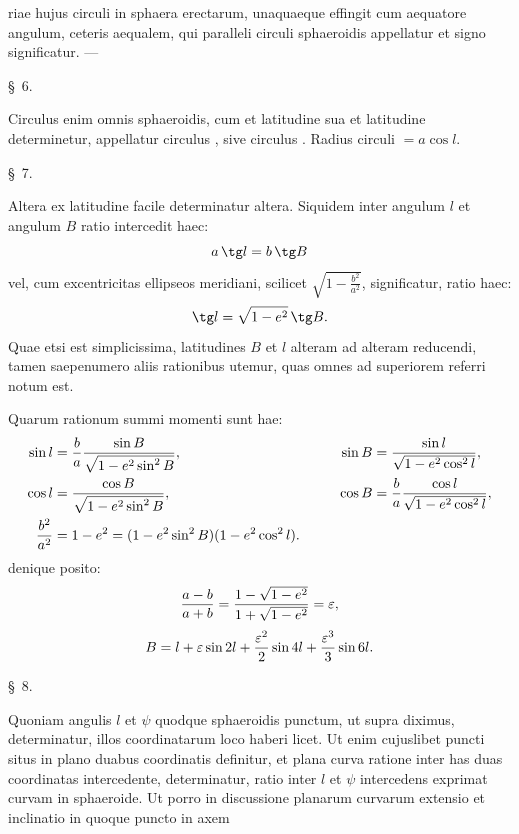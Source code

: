riae hujus circuli in sphaera erectarum, unaquaeque effingit cum aequatore angulum, ceteris aequalem, qui  paralleli circuli sphaeroidis appellatur et signo  significatur. ---

\begin{center}\S\ 6.\end{center}
Circulus enim omnis sphaeroidis, cum et latitudine sua  et latitudine  determinetur, appellatur circulus , sive circulus . Radius circuli  $=a\cos l$.

\begin{center}\S\ 7.\end{center}
Altera ex latitudine facile determinatur altera. Siquidem inter angulum $l$ et angulum $B$ ratio intercedit haec:
\[
  a\,\tg l=b\,\tg B
\]
vel, cum excentricitas ellipseos meridiani, scilicet $\sqrt{1-\frac{b^2}{a^2}}$,  significatur, ratio haec:
\[
  \tg l=\sqrt{1-e^2}\,\tg B.
\]
Quae etsi est simplicissima, latitudines $B$ et $l$ alteram ad alteram reducendi, tamen saepenumero aliis rationibus utemur, quas omnes ad superiorem referri notum est.

Quarum rationum summi momenti sunt hae:
\[
\begin{aligned}
\sin l&={b\over a}{\sin B\over\sqrt{1-e^2\sin^2 B}},
&\qquad
\sin B&={\sin l\over\sqrt{1-e^2\cos^2 l}},\\
\cos l&={\cos B\over\sqrt{1-e^2\sin^2 B}},
&
\cos B&={b\over a}{\cos l\over\sqrt{1-e^2\cos^2 l}},\\
{b^2\over a^2}&=1-e^2=(1-e^2\sin^2 B)(1-e^2\cos^2 l).
\end{aligned}
\]
denique posito:
\[
  {a-b\over a+b}={1-\sqrt{1-e^2}\over 1+\sqrt{1-e^2}}=\varepsilon,
\]
\[
  B=l+\varepsilon\sin 2l+{\varepsilon^2\over 2}\sin 4l+{\varepsilon^3\over 3}\sin 6l.
\]

\begin{center}\S\ 8.\end{center}
Quoniam angulis $l$ et $\psi$ quodque sphaeroidis punctum, ut supra diximus, determinatur, illos coordinatarum loco haberi licet. Ut enim cujuslibet puncti situs in plano duabus coordinatis definitur, et plana curva ratione inter has duas coordinatas intercedente, determinatur, ratio inter $l$ et $\psi$ intercedens exprimat curvam in sphaeroide. Ut porro in discussione planarum curvarum extensio et inclinatio in quoque puncto in axem
